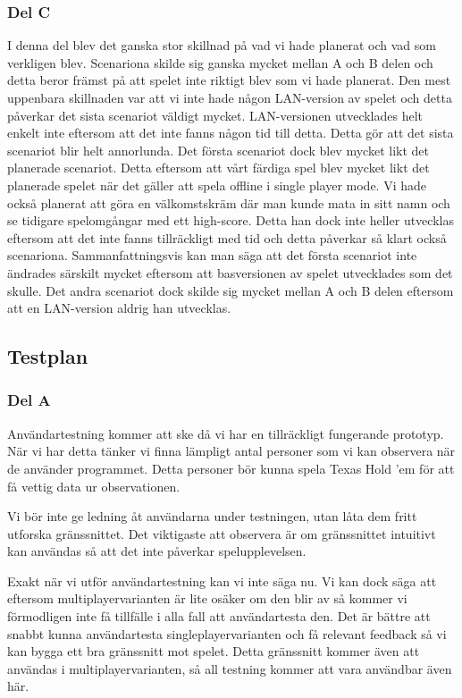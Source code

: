 \documentclass[10pt,a4paper]{article}
\begin{document}
\subsubsection*{Del C}

I denna del blev det ganska stor skillnad på vad vi hade planerat och vad som verkligen blev. Scenariona skilde sig ganska mycket mellan A och B delen och detta beror främst på att spelet inte riktigt blev som vi hade planerat. Den mest uppenbara skillnaden var att vi inte hade någon LAN-version av spelet och detta påverkar det sista scenariot väldigt mycket. LAN-versionen utvecklades helt enkelt inte eftersom att det inte fanns någon tid till detta. Detta gör att det sista scenariot blir helt annorlunda. Det första scenariot dock blev mycket likt det planerade scenariot. Detta eftersom att vårt färdiga spel blev mycket likt det planerade spelet när det gäller att spela offline i single player mode. Vi hade också planerat att göra en välkomstskräm där man kunde mata in sitt namn och se tidigare spelomgångar med ett high-score. Detta han dock inte heller utvecklas eftersom att det inte fanns tillräckligt med tid och detta påverkar så klart också scenariona. Sammanfattningsvis kan man säga att det första scenariot inte ändrades särskilt mycket eftersom att basversionen av spelet utvecklades som det skulle. Det andra scenariot dock skilde sig mycket mellan A och B delen eftersom att en LAN-version aldrig han utvecklas.

\subsection*{Testplan}

\subsubsection*{Del A}

Användartestning kommer att ske då vi har en tillräckligt fungerande
prototyp. När vi har detta tänker vi finna lämpligt antal personer som vi
kan observera när de använder programmet. Detta personer bör kunna spela
Texas Hold 'em för att få vettig data ur observationen.

Vi bör inte ge ledning åt användarna under testningen, utan låta dem fritt
utforska gränssnittet. Det viktigaste att observera är om gränssnittet
intuitivt kan användas så att det inte påverkar spelupplevelsen.

Exakt när vi utför användartestning kan vi inte säga nu. Vi kan dock säga
att eftersom multiplayervarianten är lite osäker om den blir av så kommer
vi förmodligen inte få tillfälle i alla fall att användartesta den. Det är
bättre att snabbt kunna användartesta singleplayervarianten och få relevant
feedback så vi kan bygga ett bra gränssnitt mot spelet. Detta gränssnitt
kommer även att användas i multiplayervarianten, så all testning kommer att
vara användbar även här.
\end{document}
